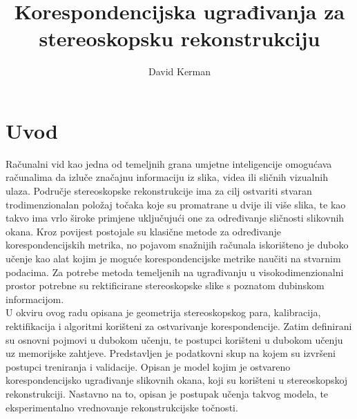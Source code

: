 \documentclass[times, utf8, zavrsni, numeric]{fer}
\begin{document}

\title{Korespondencijska ugrađivanja za stereoskopsku rekonstrukciju}

\author{David Kerman}

\maketitle




\tableofcontents

\chapter{Uvod}
Računalni vid kao jedna od temeljnih grana umjetne inteligencije omogućava računalima da izluče značajnu informaciju iz slika, videa ili sličnih vizualnih ulaza. Područje stereoskopske rekonstrukcije ima za cilj ostvariti stvaran trodimenzionalan položaj točaka koje su promatrane u dvije ili više slika, te kao takvo ima vrlo široke primjene uključujući one za određivanje sličnosti slikovnih okana. Kroz povijest postojale su klasične metode za određivanje korespondencijskih metrika, no pojavom snažnijih računala iskorišteno je duboko učenje kao alat kojim je moguće korespondencijske metrike naučiti na stvarnim podacima. Za potrebe metoda temeljenih na ugrađivanju u visokodimenzionalni prostor potrebne su rektificirane stereoskopske slike s poznatom dubinskom informacijom.\\

U okviru ovog radu opisana je geometrija stereoskopskog para, kalibracija, rektifikacija i algoritmi korišteni za ostvarivanje korespondencije. Zatim definirani su osnovni pojmovi u dubokom učenju, te postupci korišteni u dubokom učenju uz memorijske zahtjeve. Predstavljen je podatkovni skup na kojem su izvršeni postupci treniranja i validacije. Opisan je model kojim je ostvareno korespondencijsko ugrađivanje slikovnih okana, koji su korišteni u stereoskopskoj rekonstrukciji. Nastavno na to, opisan je postupak učenja takvog modela, te eksperimentalno vrednovanje rekonstrukcijske točnosti.
\end{document}
